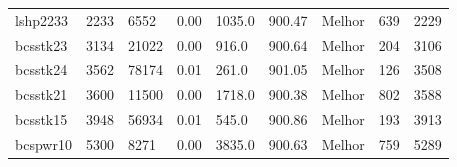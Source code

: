 \begin{table}[h!]
{\begin{tabular}{lllllllll}
			lshp2233 & 2233 & 6552 & 0.00 & 1035.0 & 900.47 & Melhor & 639 & 2229 \\
			bcsstk23 & 3134 & 21022 & 0.00 & 916.0 & 900.64 & Melhor & 204 & 3106 \\
			bcsstk24 & 3562 & 78174 & 0.01 & 261.0 & 901.05 & Melhor & 126 & 3508 \\
			bcsstk21 & 3600 & 11500 & 0.00 & 1718.0 & 900.38 & Melhor & 802 & 3588 \\
			bcsstk15 & 3948 & 56934 & 0.01 & 545.0 & 900.86 & Melhor & 193 & 3913 \\
			bcspwr10 & 5300 & 8271 & 0.00 & 3835.0 & 900.63 & Melhor & 759 & 5289 \\
			\bottomrule
		\end{tabular}
	}{
}
\end{table}